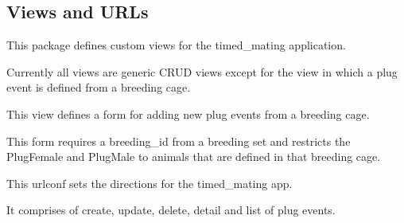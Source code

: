 \documentclass[letterpaper,10pt,english]{sphinxmanual}
\begin{document}
\subsection{Views and URLs}
\label{api:id8}\label{api:module-timed_mating.views}
This package defines custom views for the timed\_mating application.

Currently all views are generic CRUD views except for the view in which a plug event is defined from a breeding cage.


\begin{fulllineitems}
\label{api:timed_mating.views.breeding_plugevent}
This view defines a form for adding new plug events from a breeding cage.

This form requires a breeding\_id from a breeding set and restricts the PlugFemale and PlugMale to animals that are defined in that breeding cage.

\end{fulllineitems}

\label{api:module-timed_mating.urls}
This urlconf sets the directions for the timed\_mating app.

It comprises of create, update, delete, detail and list of plug events.


\begin{fulllineitems}
\label{api:timed_mating.urls.change_plugevents}
\end{fulllineitems}



\begin{fulllineitems}
\label{api:timed_mating.urls.create_plugevents}
\end{fulllineitems}


\end{document}
